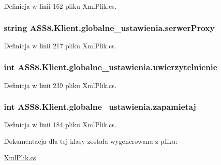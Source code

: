 Definicja w linii 162 pliku XmlPlik.cs.\hypertarget{a00006_2d630192bb1ad9a8ce0553ff7915196e}{
\subsubsection[{serwerProxy}]{\setlength{\rightskip}{0pt plus 5cm}string ASS8.Klient.globalne\_\-ustawienia.serwerProxy}}
\label{de/d21/a00006_2d630192bb1ad9a8ce0553ff7915196e}




Definicja w linii 217 pliku XmlPlik.cs.\hypertarget{a00006_b3f28fbc37dd9282cbd8e62b783132f6}{
\subsubsection[{uwierzytelnienie}]{\setlength{\rightskip}{0pt plus 5cm}int ASS8.Klient.globalne\_\-ustawienia.uwierzytelnienie}}
\label{de/d21/a00006_b3f28fbc37dd9282cbd8e62b783132f6}




Definicja w linii 239 pliku XmlPlik.cs.\hypertarget{a00006_a0c8d040782f8be937e5d26480912e4a}{
\subsubsection[{zapamietaj}]{\setlength{\rightskip}{0pt plus 5cm}int ASS8.Klient.globalne\_\-ustawienia.zapamietaj}}
\label{de/d21/a00006_a0c8d040782f8be937e5d26480912e4a}




Definicja w linii 184 pliku XmlPlik.cs.

Dokumentacja dla tej klasy została wygenerowana z pliku:\begin{CompactItemize}
\item 
\hyperlink{a00054}{XmlPlik.cs}\end{CompactItemize}
